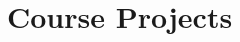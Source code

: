 {{\begin{multicols}{2}
{\begin{itemize}

        \end{itemize}
        }

        \vfill\null
        \columnbreak

        \section{Course Projects}


\end{multicols}}}
